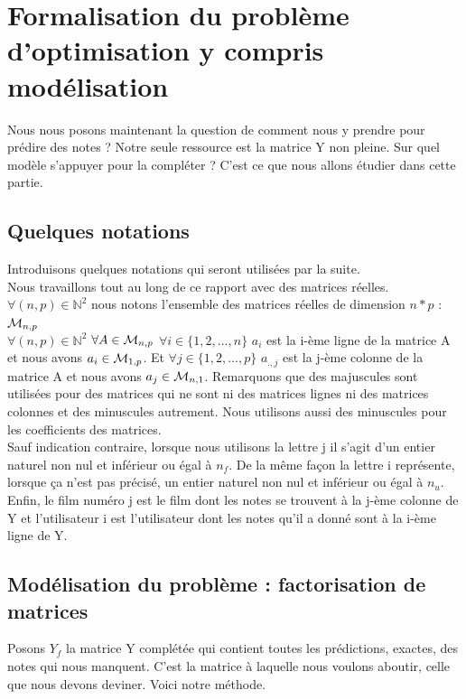 \documentclass[a4paper,10pt]{article}
\begin{document}
\section{Formalisation du problème d'optimisation y compris modélisation}

Nous nous posons maintenant la question de comment nous y prendre pour prédire des notes ?
Notre seule ressource est la matrice Y non pleine. Sur quel modèle s'appuyer pour la compléter ?
C'est ce que nous allons étudier dans cette partie.

\subsection{Quelques notations}

Introduisons quelques notations qui seront utilisées par la suite.\\

Nous travaillons tout au long de ce rapport avec des matrices réelles. $\forall (n, p) \in \mathbb{N}^2$ nous notons l'ensemble des matrices réelles de dimension $n * p$ : ${\cal M}_{n, p}$\\
$\forall (n, p) \in \mathbb{N}^2$ $\forall A \in {\cal M}_{n, p}$ $\forall i \in \{1, 2, ..., n\}$ $a_i$ est la i-ème ligne de la matrice A et nous avons $a_i \in {\cal M}_{1, p}$. Et $\forall j \in \{1, 2, ..., p\}$ $a_{., j}$ est la j-ème colonne de la matrice A et nous avons $a_j \in {\cal M}_{n, 1}$. Remarquons que des majuscules sont utilisées pour des matrices qui ne sont ni des matrices lignes ni des matrices colonnes et des minuscules autrement. Nous utilisons aussi des minuscules pour les coefficients des matrices.\\
Sauf indication contraire, lorsque nous utilisons la lettre j il s'agit d'un entier naturel non nul et inférieur ou égal à $n_f$. De la même façon la lettre i représente, lorsque ça n'est pas précisé, un entier naturel non nul et inférieur ou égal à $n_u$.\\
Enfin, le film numéro j est le film dont les notes se trouvent à la j-ème colonne de Y et l'utilisateur i est l'utilisateur dont les notes qu'il a donné sont à la i-ème ligne de Y.

\subsection{Modélisation du problème : factorisation de matrices}

Posons $Y_f$ la matrice Y complétée qui contient toutes les prédictions, exactes, des notes qui nous manquent. C'est la matrice à laquelle nous voulons aboutir, celle que nous devons deviner. Voici notre méthode.\\ 
 
\end{document}
